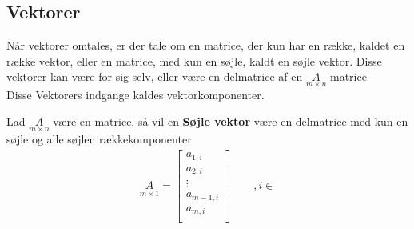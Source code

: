 \subsection{Vektorer}
Når vektorer omtales, er der tale om en matrice, der kun har en række, kaldet en række vektor, eller en matrice, med kun en søjle, kaldt en søjle vektor. Disse vektorer kan være for sig selv, eller være en delmatrice af en $\underset{m \times n}{A}$ matrice\\
Disse Vektorers indgange  kaldes vektorkomponenter. %




\begin{defn}
Lad $\underset{m \times n}{A}$ være en matrice, så vil en \textbf{Søjle vektor} være en delmatrice med kun en søjle og alle søjlen rækkekomponenter
\begin{align*}
\underset{m \times 1}{A} = 
\begin{bmatrix}
a_{1,i}\\
a_{2,i}\\
\vdots \\
a_{m-1,i}\\
a_{m,i} \\
\end{bmatrix}\qquad , i\in %
\end{align*}
\end{defn}

